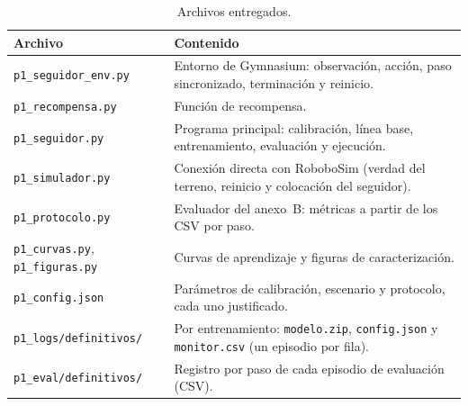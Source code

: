 \documentclass[11pt,a4paper]{article}
\newcommand{\cod}[1]{\texttt{\small #1}}
\begin{document}
\begin{table}[h]
\centering\small
\caption{Archivos entregados.}
\label{tab:archivos}
\begin{tabularx}{\linewidth}{@{}lY@{}}
\toprule
Archivo & Contenido \\
\midrule
\cod{p1\_seguidor\_env.py} & Entorno de Gymnasium: observación, acción, paso sincronizado, terminación y reinicio. \\
\cod{p1\_recompensa.py} & Función de recompensa. \\
\cod{p1\_seguidor.py} & Programa principal: calibración, línea base, entrenamiento, evaluación y ejecución. \\
\cod{p1\_simulador.py} & Conexión directa con RoboboSim (verdad del terreno, reinicio y colocación del seguidor). \\
\cod{p1\_protocolo.py} & Evaluador del anexo~B: métricas a partir de los CSV por paso. \\
\cod{p1\_curvas.py}, \cod{p1\_figuras.py} & Curvas de aprendizaje y figuras de caracterización. \\
\cod{p1\_config.json} & Parámetros de calibración, escenario y protocolo, cada uno justificado. \\
\cod{p1\_logs/definitivos/} & Por entrenamiento: \cod{modelo.zip}, \cod{config.json} y \cod{monitor.csv} (un episodio por fila). \\
\cod{p1\_eval/definitivos/} & Registro por paso de cada episodio de evaluación (CSV). \\
\bottomrule
\end{tabularx}
\end{table}
\end{document}

